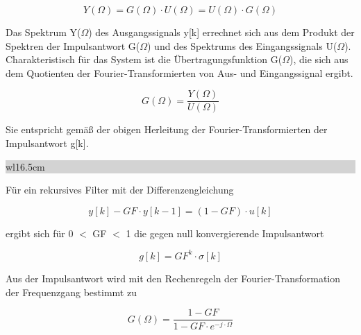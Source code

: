 \begin{equation}\label{eq:eightthirteen}
Y\left(\Omega \right)=G\left(\Omega \right)\cdot U\left(\Omega \right)=U\left(\Omega \right)\cdot G\left(\Omega \right)
\end{equation}

\noindent Das Spektrum Y($\Omega$) des Ausgangssignals y[k] errechnet sich aus dem Produkt der Spektren der Impulsantwort G($\Omega$) und des Spektrums des Eingangssignals U($\Omega$). Charakteristisch f\"{u}r das System ist die \"{U}bertragungsfunktion G($\Omega$), die sich aus dem Quotienten der Fourier-Transformierten von Aus- und Eingangssignal ergibt.

\begin{equation}\label{eq:eightfourteen}
G\left(\Omega \right)=\frac{Y\left(\Omega \right)}{U\left(\Omega \right)}
\end{equation}

\noindent Sie entspricht gem\"{a}{\ss} der obigen Herleitung der Fourier-Transformierten der Impulsantwort g[k].\bigskip

\noindent
\colorbox{lightgray}{%
%
\renewcommand\arraystretch{0.6}%
\begin{tabular}{ wl{16.5cm} }
{\selectfont{Beispiel: Rekursives Tiefpass-Filter}}
\end{tabular}%
}\medskip

\noindent F\"{u}r ein rekursives Filter mit der Differenzengleichung

\begin{equation}\label{eq:eightfifteen}
y\left[k\right]-GF\cdot y\left[k-1\right]=\left(1-GF\right)\cdot u\left[k\right]
\end{equation}

\noindent ergibt sich f\"{u}r 0 $\mathrm{<}$ GF $\mathrm{<}$ 1 die gegen null konvergierende Impulsantwort

\begin{equation}\label{eq:eightsixteen}
g\left[k\right]=GF^{k} \cdot \sigma \left[k\right]
\end{equation}

\clearpage

\noindent Aus der Impulsantwort wird mit den Rechenregeln der Fourier-Transformation der Frequenzgang bestimmt zu

\begin{equation}\label{eq:eightseventeen}
G\left(\Omega \right)=\frac{1-GF}{1-GF\cdot e^{-j\cdot \Omega }}
\end{equation}

